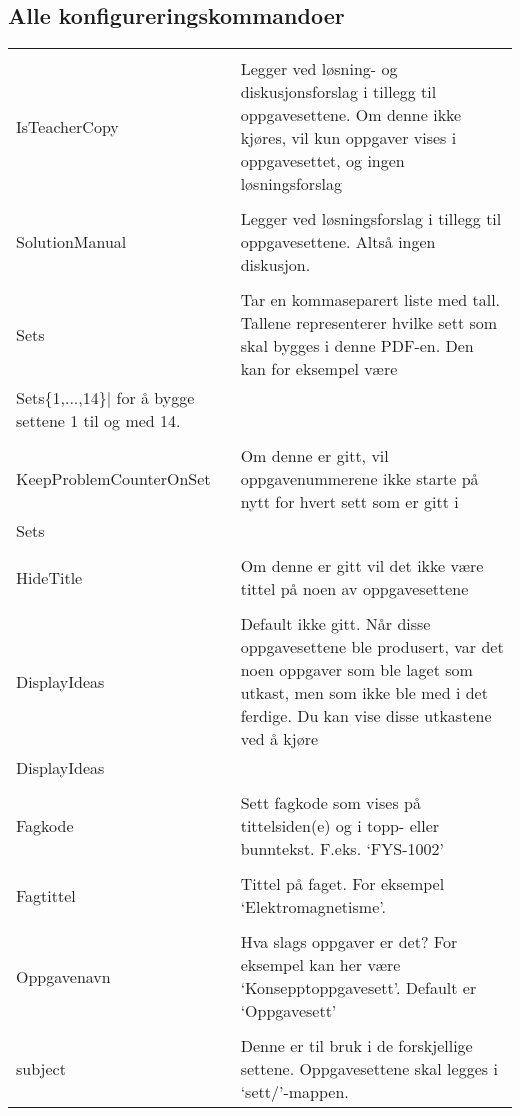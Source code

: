 \documentclass{article}
\begin{document}
\subsection*{Alle konfigureringskommandoer}
\begin{tabularx}{\textwidth}{lX}
	\lstinline{\\IsTeacherCopy}&
	Legger ved løsning- og diskusjonsforslag i tillegg til oppgavesettene. Om denne ikke kjøres, vil kun oppgaver vises i oppgavesettet, og ingen løsningsforslag\\
	\lstinline{\\SolutionManual}&Legger ved løsningsforslag i tillegg til oppgavesettene. Altså ingen diskusjon.\\
	\lstinline{\\Sets}&Tar en kommaseparert liste med tall. Tallene representerer hvilke sett som skal bygges i denne PDF-en. Den kan for eksempel være \lstinline|\\Sets\{1,...,14\}| for å bygge settene 1 til og med 14.\\
	\lstinline{\\KeepProblemCounterOnSet}&Om denne er gitt, vil oppgavenummerene ikke starte på nytt for hvert sett som er gitt i \lstinline{\\Sets}. \\
	\lstinline{\\HideTitle}&Om denne er gitt vil det ikke være tittel på noen av oppgavesettene\\
	\lstinline{\\DisplayIdeas}&Default ikke gitt. Når disse oppgavesettene ble produsert, var det noen oppgaver som ble laget som utkast, men som ikke ble med i det ferdige. Du kan vise disse utkastene ved å kjøre \lstinline{\\DisplayIdeas} i config.tex.\\
	\lstinline{\\Fagkode}&Sett fagkode som vises på tittelsiden(e) og i topp- eller bunntekst. F.eks. `FYS-1002'\\
	\lstinline{\\Fagtittel}&Tittel på faget. For eksempel `Elektromagnetisme'.\\
	\lstinline{\\Oppgavenavn}&Hva slags oppgaver er det? For eksempel kan her være `Konsepptoppgavesett'. Default er `Oppgavesett'\\
	\lstinline{\\subject}&Denne er til bruk i de forskjellige settene. Oppgavesettene skal legges i `sett/'-mappen.

\end{tabularx}
\end{document}
